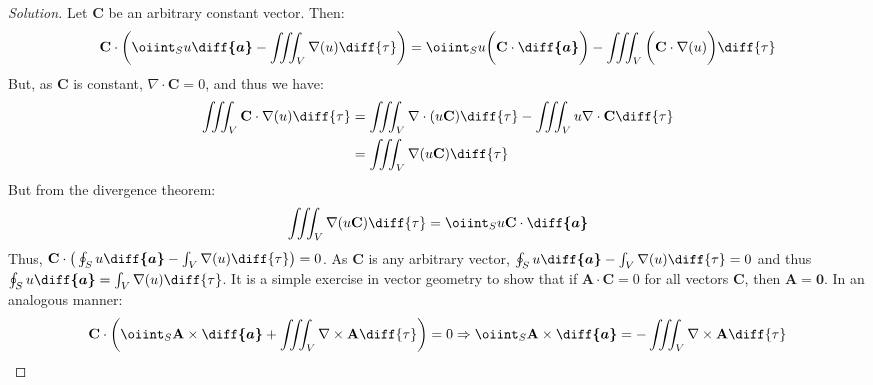 \documentclass[crop=false,class=article,oneside]{standalone}
\begin{document}
        \begin{proof}[Solution]
            Let $\mathbf{C}$ be an arbitrary constant vector. Then:
            \begin{equation*}
                \mathbf{C}\cdot\bigg(
                    \oiint_{S}u\boldsymbol{\diff{a}}
                    -\iiint_{V}\nabla(u)\diff{\tau}
                \bigg)
                =\oiint_{S}u\bigg(
                    \mathbf{C}\cdot\boldsymbol{\diff{a}}
                \bigg)
                -\iiint_{V}\bigg(
                    \mathbf{C}\cdot\nabla(u)
                \bigg)\diff{\tau}
            \end{equation*}
            But, as $\mathbf{C}$ is constant,
            $\nabla\cdot\mathbf{C}=0$, and thus we have:
            \begin{align*}
                \iiint_{V}\mathbf{C}\cdot\nabla(u)\diff{\tau}
                &=\iiint_{V}\nabla\cdot(u\mathbf{C})\diff{\tau}
                -\iiint_{V}u\nabla\cdot\mathbf{C}\diff{\tau}\\
                &=\iiint_{V}\nabla(u\mathbf{C})\diff{\tau}
            \end{align*}
            But from the divergence theorem:
            \begin{equation*}
                \iiint_{V}\nabla(u\mathbf{C})\diff{\tau}
                =\oiint_{S}u\mathbf{C}\cdot\boldsymbol{\diff{a}}
            \end{equation*}
            Thus,
            $\mathbf{C}\cdot\big(%
                 \oint_{S}u\boldsymbol{\diff{a}}%
                 -\int_{V}\nabla(u)\diff{\tau}%
            \big)=0$.
            As $\mathbf{C}$ is any arbitrary vector,
            $\oint_{S}u\boldsymbol{\diff{a}}%
             -\int_{V}\nabla(u)\diff{\tau}=0$
            and thus
            $\oint_{S}u\boldsymbol{\diff{a}}%
             =\int_{V}\nabla(u)\diff{\tau}$.
            It is a simple exercise in vector geometry
            to show that if $\mathbf{A}\cdot\mathbf{C}=0$
            for all vectors $\mathbf{C}$, then
            $\mathbf{A}=\mathbf{0}$. In an analogous manner:
            \begin{align*}
                \mathbf{C}\cdot\bigg(
                    \oiint_{S}\mathbf{A}\times\boldsymbol{\diff{a}}
                    +\iiint_{V}\nabla\times\mathbf{A}\diff{\tau}
                \bigg)
                =0\Rightarrow\oiint_{S}
                \mathbf{A}\times\boldsymbol{\diff{a}}
                =-\iiint_{V}\nabla\times\mathbf{A}\diff{\tau}
            \end{align*}
        \end{proof}
\end{document}

